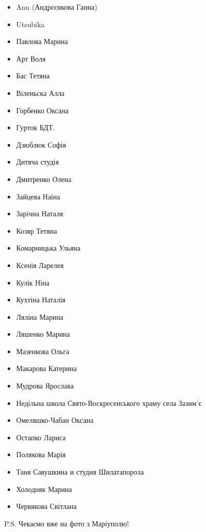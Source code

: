 \begin{itemize}
  \item Ann (Андрєєнкова Ганна)
  \item Utsubika
  \item Павлова Марина
  \item Арт Воля
  \item Бас Тетяна
  \item Віленьска Алла
  \item Горбенко Оксана
  \item Гурток БДТ.
  \item Дзюблюк Софія
  \item Дитяча студія
  \item Дмитренко Олена
  \item Зайцева Наіна
  \item Зарічна Наталя
  \item Козяр Тетяна
  \item Комарницька Ульяна
  \item Ксенія Ларелея
  \item Кулік Ніна
  \item Кухтіна Наталія
  \item Ляліна Марина
  \item Ляшенко Марина
  \item Мазенкова Ольга
  \item Макарова Катерина
  \item Мудрова Ярослава
  \item Недільна школа Свято-Воскресенського храму села Зазим'є
  \item Омеляшко-Чабан Оксана
  \item Остапко Лариса
  \item Полякова Марія
  \item Таня Савушкина и студия Шилатапорола
  \item Холодняк Марина
  \item Червякова Світлана
\end{itemize}

P.S. Чекаємо вже на фото з Маріуполю! 
